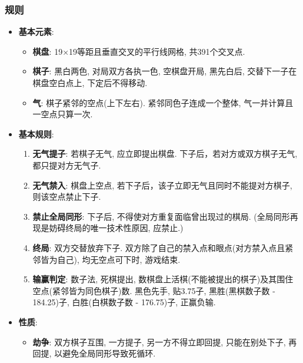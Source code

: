 \documentclass{article}
\begin{document}
        \subsubsection{规则}
            \begin{itemize}
            \item  \textbf{基本元素}:
                \begin{itemize}
                    \item \textbf{棋盘}: 19×19等距且垂直交叉的平行线网格, 共391个交叉点.
                    \item \textbf{棋子}: 黑白两色, 对局双方各执一色, 空棋盘开局, 黑先白后, 交替下一子在棋盘空白点上, 下定后不得移动.
                    \item \textbf{气}: 棋子紧邻的空点(上下左右). 紧邻同色子连成一个整体, 气一并计算且一空点只算一次.
                \end{itemize}
            
            \item  \textbf{基本规则}:
                \begin{enumerate}
                    \item \textbf{无气提子}: 若棋子无气, 应立即提出棋盘. 下子后，若对方或双方棋子无气, 都只提对方无气子.
                    \item \textbf{无气禁入}: 棋盘上空点, 若下子后，该子立即无气且同时不能提对方棋子, 则该空点禁止下子.
                    \item \textbf{禁止全局同形}: 下子后, 不得使对方重复面临曾出现过的棋局. (全局同形再现是妨碍终局的唯一技术性原因, 应禁止.)
                    \item \textbf{终局}: 双方交替放弃下子. 双方除了自己的禁入点和眼点(对方禁入点且紧邻皆为自己), 均无空点可下时, 游戏结束.
                    \item \textbf{输赢判定}: 数子法, 死棋提出, 数棋盘上活棋(不能被提出的棋子)及其围住空点(紧邻皆为同色棋子)数. 黑色先手, 贴3.75子, 黑胜(黑棋数子数 - 184.25)子, 白胜(白棋数子数 - 176.75)子, 正赢负输.
                \end{enumerate}
                
            \item \textbf{性质}:
                \begin{itemize}
                    \item \textbf{劫争}: 双方棋子互围, 一方提子, 另一方不得立即回提, 只能在别处下子, 再回提, 以避免全局同形导致死循环.
                \end{itemize}
            \end{itemize}
\end{document}
